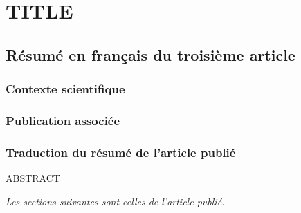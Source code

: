 \chapter{TITLE}
\label{chap3}

\section{Résumé en français du troisième article}

\subsection{Contexte scientifique}

\subsection{Publication associée}

\subsection{Traduction du résumé de l'article publié}

ABSTRACT

\textit{Les sections suivantes sont celles de l’article publié.}

